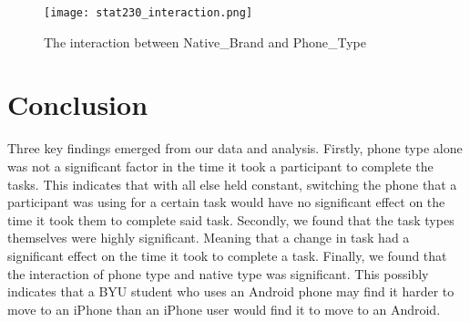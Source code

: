 \documentclass[conference]{IEEEtran}
\begin{document}
\begin{figure}
    \centering
    \texttt{[image: stat230\_interaction.png]}
    \caption{The interaction between Native\_Brand and Phone\_Type}
    \label{fig:fig2}
\end{figure}

\section{Conclusion}

Three key findings emerged from our data and analysis. Firstly, phone type alone was not a significant factor in the time it took a participant to complete the tasks. This indicates that with all else held constant, switching the phone that a participant was using for a certain task would have no significant effect on the time it took them to complete said task. Secondly, we found that the task types themselves were highly significant. Meaning that a change in task had a significant effect on the time it took to complete a task. Finally, we found that the interaction of phone type and native type was significant. This possibly indicates that a BYU student who uses an Android phone may find it harder to move to an iPhone than an iPhone user would find it to move to an Android. 
\end{document}
